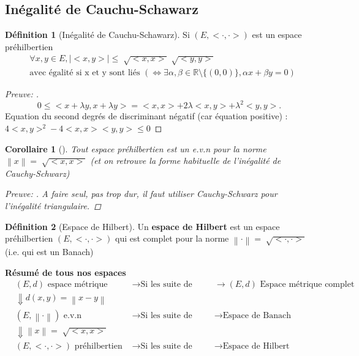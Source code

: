 \documentclass{article}
\theoremstyle{plain}%
\newtheorem*{cor}{Corollaire}
\theoremstyle{definition}
\newtheorem{defn}{Définition}[section]
\theoremstyle{remark}
\begin{document}
\subsection{Inégalité de Cauchu-Schawarz}
\begin{defn}[Inégalité de Cauchu-Schawarz]
	Si $ (E, < \cdot , \cdot >) $ est un espace préhilbertien
	\begin{align*}
		&\forall x,y \in E, \left| <x,y> \right| \leq \sqrt[]{<x,x>}\sqrt[]{<y,y>} \\
		& \text{avec égalité si x et y sont liés } (\Leftrightarrow \exists \alpha , \beta \in \mathbb{R} \setminus \{(0,0)\}, \alpha x + \beta y = 0 ) 
	\end{align*}

	\begin{proof}[Preuve: ]
		\[
			0 \leq < x+\lambda y, x+ \lambda y > = <x,x> + 2 \lambda <x,y> + \lambda ^2 <y,y> 
		.\]
		Equation du second degrés de discriminant négatif (car équation positive) : $ 4 <x,y>^2 - 4<x,x><y,y> \leq 0 $ 
	\end{proof}
\end{defn}

\begin{cor}[]
	Tout espace préhilbertien est un e.v.n pour la norme $ \left\| x \right\| = \sqrt[]{<x,x>} $ (et on retrouve la forme habituelle de l'inégalité de Cauchy-Schwarz) 

	\begin{proof}[Preuve: ]
		A faire seul, pas trop dur, il faut utiliser Cauchy-Schwarz pour l'inégalité triangulaire.
	\end{proof}
\end{cor}

\begin{defn}[Espace de Hilbert]
	Un \textbf{espace de Hilbert} est un espace préhilbertien $ (E, <\cdot , \cdot >) $ qui est complet pour la norme $ \left\| \cdot  \right\| = \sqrt[]{<\cdot , \cdot >} $ (i.e. qui est un Banach)
\end{defn}

\textbf{Résumé de tous nos espaces} \\
\begin{align*}
	& (E, d) \text{ espace métrique } &\rightarrow \text{Si les suite de cauchy convergent } &\rightarrow (E,d) \text{ Espace métrique complet} \\
	& \Downarrow d(x,y) = \left\| x-y \right\|  \\
	& (E, \left\| \cdot  \right\| )  \text{ e.v.n } &\rightarrow \text{Si les suite de cauchy convergent} &\rightarrow \text{Espace de Banach}  \\
	& \Downarrow \left\| x \right\| = \sqrt[]{<x,x>} \\
	& (E, <\cdot , \cdot >)  \text{ préhilbertien } &\rightarrow \text{Si les suite de cauchy convergent} &\rightarrow \text{Espace de Hilbert} \\
\end{align*}
\end{document}
